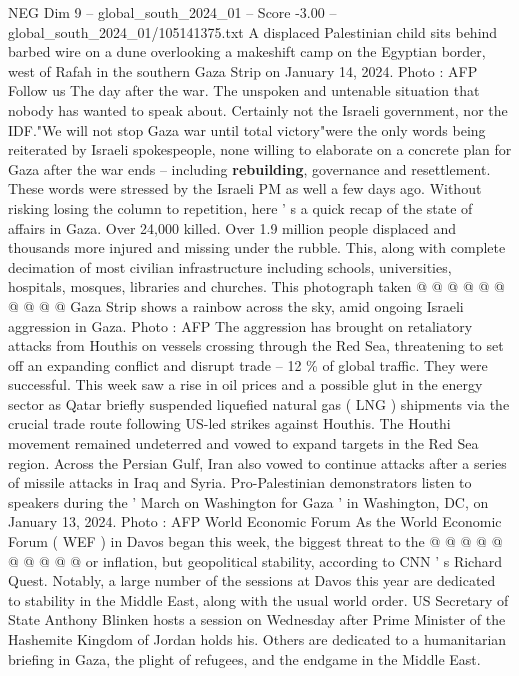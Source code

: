 \begin{textsample}{NEG Dim 9 – global\_south\_2024\_01 – Score -3.00 – global\_south\_2024\_01/105141375.txt}  \label{ex:f9_neg_386}
A displaced Palestinian child sits behind barbed wire on a dune overlooking a makeshift camp on the Egyptian border, west of Rafah in the southern Gaza Strip on January 14, 2024.
Photo : AFP Follow us The day after the war.
The unspoken and untenable situation that nobody has wanted to speak about.
Certainly not the Israeli government, nor the IDF."We will not stop Gaza war until total victory"were the only words being reiterated by Israeli spokespeople, none willing to elaborate on a concrete plan for Gaza after the war ends -- including \textbf{rebuilding}, governance and resettlement.
These words were stressed by the Israeli PM as well a few days ago.
Without risking losing the column to repetition, here ' s a quick recap of the state of affairs in Gaza.
Over 24,000 killed.
Over 1.9 million people displaced and thousands more injured and missing under the rubble.
This, along with complete decimation of most civilian infrastructure including schools, universities, hospitals, mosques, libraries and churches.
This photograph taken @ @ @ @ @ @ @ @ @ @ Gaza Strip shows a rainbow across the sky, amid ongoing Israeli aggression in Gaza.
Photo : AFP The aggression has brought on retaliatory attacks from Houthis on vessels crossing through the Red Sea, threatening to set off an expanding conflict and disrupt trade -- 12 \% of global traffic.
They were successful.
This week saw a rise in oil prices and a possible glut in the energy sector as Qatar briefly suspended liquefied natural gas ( LNG ) shipments via the crucial trade route following US-led strikes against Houthis.
The Houthi movement remained undeterred and vowed to expand targets in the Red Sea region.
Across the Persian Gulf, Iran also vowed to continue attacks after a series of missile attacks in Iraq and Syria.
Pro-Palestinian demonstrators listen to speakers during the ' March on Washington for Gaza ' in Washington, DC, on January 13, 2024.
Photo : AFP World Economic Forum As the World Economic Forum ( WEF ) in Davos began this week, the biggest threat to the @ @ @ @ @ @ @ @ @ @ or inflation, but geopolitical stability, according to CNN ' s Richard Quest.
Notably, a large number of the sessions at Davos this year are dedicated to stability in the Middle East, along with the usual world order.
US Secretary of State Anthony Blinken hosts a session on Wednesday after Prime Minister of the Hashemite Kingdom of Jordan holds his.
Others are dedicated to a humanitarian briefing in Gaza, the plight of refugees, and the endgame in the Middle East.

\end{textsample}
